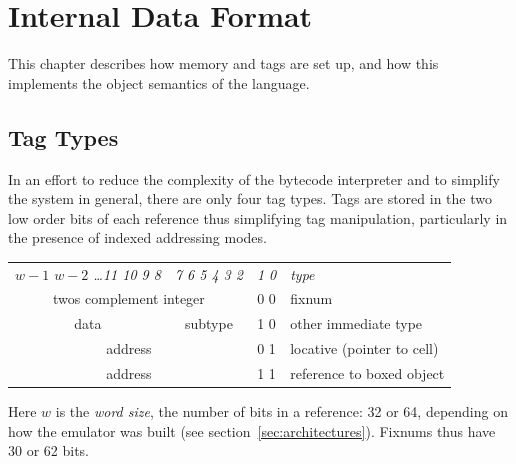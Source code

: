 %
%
%


\chapter{Internal Data Format}

This chapter describes how memory and tags are set up, and how this
implements the object semantics of the language.

\section{Tag Types} \label{immtags}

In an effort to reduce the complexity of the bytecode interpreter and
to simplify the system in general, there are only four tag types.
Tags are stored in the two low order bits of each reference thus
simplifying tag manipulation, particularly in the presence of indexed
addressing modes.

\begin{center}
\begin{tabular}{|c|c|c|l}
\cline{1-3}
\em $w{-}1$ $w{-}2$ \ldots 11 10 9 8 & \em 7 6 5 4 3 2 & \em 1 0 &
 \multicolumn{1}{l}{\emph{type}} \\ \cline{1-3}
\multicolumn{2}{|c|}{twos complement integer} & 0 0 & fixnum \\ \cline{1-3}
data	&	subtype		& 1 0 & other immediate type \\ \cline{1-3}
\multicolumn{2}{|c|}{address}	& 0 1 & locative (pointer to cell) \\ \cline{1-3}
\multicolumn{2}{|c|}{address}	& 1 1 & reference to boxed object \\ \cline{1-3}
\end{tabular}
\end{center}

Here $w$ is the \emph{word size}, the number of bits in a reference:
32 or 64, depending on how the emulator was built (see
section~\ref{sec:architectures}).  Fixnums thus have 30 or 62 bits.

